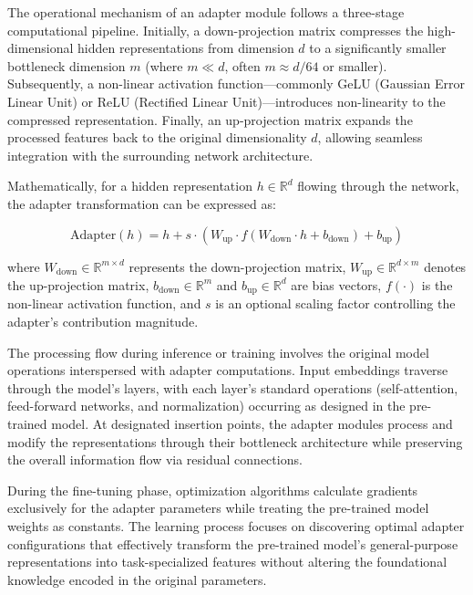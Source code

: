 \vspace{0.5cm}

The operational mechanism of an adapter module follows a three-stage computational pipeline. Initially, a down-projection matrix compresses the high-dimensional hidden representations from dimension $d$ to a significantly smaller bottleneck dimension $m$ (where $m \ll d$, often $m \approx d/64$ or smaller). Subsequently, a non-linear activation function—commonly GeLU (Gaussian Error Linear Unit) or ReLU (Rectified Linear Unit)—introduces non-linearity to the compressed representation. Finally, an up-projection matrix expands the processed features back to the original dimensionality $d$, allowing seamless integration with the surrounding network architecture.

\vspace{0.5cm}

Mathematically, for a hidden representation $h \in \mathbb{R}^d$ flowing through the network, the adapter transformation can be expressed as:

\begin{equation}
\text{Adapter}(h) = h + s \cdot (W_{\text{up}} \cdot f(W_{\text{down}} \cdot h + b_{\text{down}}) + b_{\text{up}})
\end{equation}

where $W_{\text{down}} \in \mathbb{R}^{m \times d}$ represents the down-projection matrix, $W_{\text{up}} \in \mathbb{R}^{d \times m}$ denotes the up-projection matrix, $b_{\text{down}} \in \mathbb{R}^m$ and $b_{\text{up}} \in \mathbb{R}^d$ are bias vectors, $f(\cdot)$ is the non-linear activation function, and $s$ is an optional scaling factor controlling the adapter's contribution magnitude.

\vspace{0.5cm}

The processing flow during inference or training involves the original model operations interspersed with adapter computations. Input embeddings traverse through the model's layers, with each layer's standard operations (self-attention, feed-forward networks, and normalization) occurring as designed in the pre-trained model. At designated insertion points, the adapter modules process and modify the representations through their bottleneck architecture while preserving the overall information flow via residual connections.

\vspace{0.5cm}

During the fine-tuning phase, optimization algorithms calculate gradients exclusively for the adapter parameters while treating the pre-trained model weights as constants. The learning process focuses on discovering optimal adapter configurations that effectively transform the pre-trained model's general-purpose representations into task-specialized features without altering the foundational knowledge encoded in the original parameters.


